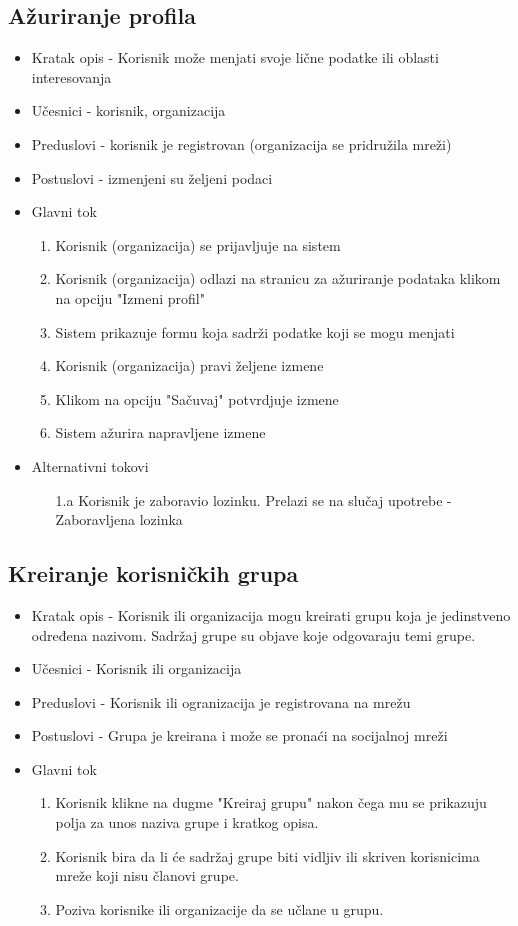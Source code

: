 \subsection{Ažuriranje profila}
\begin{itemize}
\item Kratak opis - Korisnik može menjati svoje lične podatke ili oblasti interesovanja
\item Učesnici - korisnik, organizacija
\item Preduslovi - korisnik je registrovan (organizacija se pridružila mreži)
\item Postuslovi - izmenjeni su željeni podaci
\item Glavni tok
\begin{enumerate}
\item Korisnik (organizacija) se prijavljuje na sistem
\item Korisnik (organizacija) odlazi na stranicu za ažuriranje podataka klikom na opciju "Izmeni profil"
\item Sistem prikazuje formu koja sadrži podatke koji se mogu menjati
\item Korisnik (organizacija) pravi željene izmene
\item Klikom na opciju "Sačuvaj" potvrdjuje izmene
\item Sistem ažurira napravljene izmene
\end{enumerate}
\item Alternativni tokovi
    \begin{itemize}
    \item[1.a] Korisnik je zaboravio lozinku. Prelazi se na slučaj upotrebe - Zaboravljena lozinka
    \end{itemize}
\end{itemize}

\subsection{Kreiranje korisničkih grupa}
\begin{itemize}
\item Kratak opis - Korisnik ili organizacija mogu kreirati grupu koja je jedinstveno određena nazivom. Sadržaj grupe su objave koje odgovaraju temi grupe.
\item Učesnici - Korisnik ili organizacija
\item Preduslovi - Korisnik ili ogranizacija je registrovana na mrežu
\item Postuslovi - Grupa je kreirana i može se pronaći na socijalnoj mreži 
\item Glavni tok
    \begin{enumerate}
	\item Korisnik klikne na dugme "Kreiraj grupu" nakon čega mu se prikazuju polja za unos naziva grupe i kratkog opisa.
	\item Korisnik bira da li će sadržaj grupe biti vidljiv ili skriven korisnicima mreže koji nisu članovi grupe.
	\item Poziva korisnike ili organizacije da se učlane u grupu.
    \end{enumerate}
\end{itemize}


